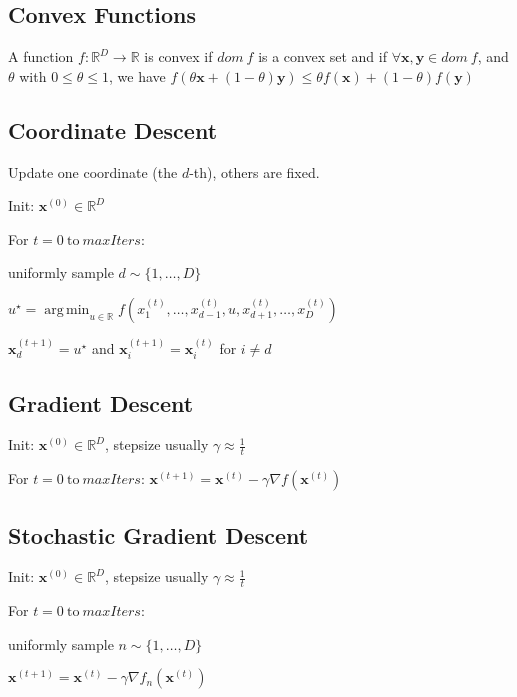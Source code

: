 \documentclass[a4paper, 11pt, landscape]{article}
\DeclareMathOperator*{\argmin}{arg\,min}
\begin{document}
\begin{multicols*}{3}
\subsection{Convex Functions}
A function $f : \mathbb{R}^D \rightarrow \mathbb{R}$ is convex if $dom\ f$ is a convex set and if $\forall \mathbf{x}, \mathbf{y} \in dom\ f$, and $\theta$ with $0 \leq \theta \leq 1$, we have $f(\theta \mathbf{x} + (1 - \theta)\mathbf{y}) \leq \theta f(\mathbf{x}) + (1-\theta)f(\mathbf{y})$

\subsection{Coordinate Descent}
Update one coordinate (the $d$-th), others are fixed.
\begin{inparaenum}
	\item Init: $\mathbf{x}^{(0)} \in \mathbb{R}^D$
	\item For $t = 0 \ \text{to} \ \mathit{maxIters}$:
	\item uniformly sample $d \sim \{1, \ldots, D\}$
	\item $u^\star = \argmin_{u \in \mathbb{R}} f(x_1^{(t)}, \ldots, x_{d-1}^{(t)}, u, x_{d+1}^{(t)}, \ldots, x_D^{(t)})$
	\item $\mathbf{x}_d^{(t+1)} = u^\star$ and $\mathbf{x}_i^{(t+1)} = \mathbf{x}_i^{(t)}$ for $i \neq d$
\end{inparaenum}

\subsection{Gradient Descent}
\begin{inparaenum}
	\item Init: $\mathbf{x}^{(0)} \in \mathbb{R}^D$, stepsize usually $\gamma \approx \frac{1}{t}$
	\item For $t = 0 \ \text{to} \ \mathit{maxIters}$: $\mathbf{x}^{(t+1)} = \mathbf{x}^{(t)} - \gamma \nabla f(\mathbf{x}^{(t)})$
\end{inparaenum}

\subsection{Stochastic Gradient Descent}
\begin{inparaenum}
	\item Init: $\mathbf{x}^{(0)} \in \mathbb{R}^D$, stepsize usually $\gamma \approx \frac{1}{t}$
	\item For $t = 0 \ \text{to} \ \mathit{maxIters}$:
	\item uniformly sample $n \sim \{1, \ldots, D\}$
	\item $\mathbf{x}^{(t+1)} = \mathbf{x}^{(t)} - \gamma \nabla f_n(\mathbf{x}^{(t)})$
\end{inparaenum}


\end{multicols*}
\end{document}
